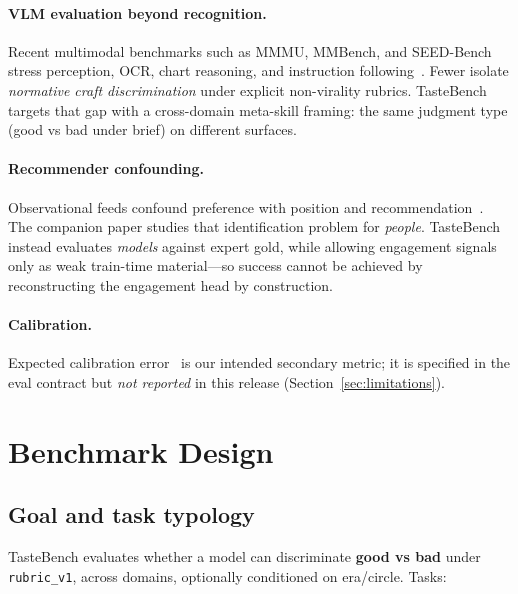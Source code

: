 \documentclass[11pt,a4paper]{article}
\begin{document}
\paragraph{VLM evaluation beyond recognition.}
Recent multimodal benchmarks such as MMMU, MMBench, and SEED-Bench stress perception, OCR, chart reasoning, and instruction following~\citep{yue2024mmmu,liu2023mmbench,li2023seed}. Fewer isolate \emph{normative craft discrimination} under explicit non-virality rubrics. TasteBench targets that gap with a cross-domain meta-skill framing: the same judgment type (good vs bad under brief) on different surfaces.

\paragraph{Recommender confounding.}
Observational feeds confound preference with position and recommendation~\citep{joachims2017unbiased}. The companion paper studies that identification problem for \emph{people}. TasteBench instead evaluates \emph{models} against expert gold, while allowing engagement signals only as weak train-time material---so success cannot be achieved by reconstructing the engagement head by construction.

\paragraph{Calibration.}
Expected calibration error~\citep{guo2017calibration} is our intended secondary metric; it is specified in the eval contract but \emph{not reported} in this release (Section~\ref{sec:limitations}).

\section{Benchmark Design}
\label{sec:design}

\subsection{Goal and task typology}

TasteBench evaluates whether a model can discriminate \textbf{good vs bad} under \texttt{rubric\_v1}, across domains, optionally conditioned on era/circle. Tasks:
\end{document}

